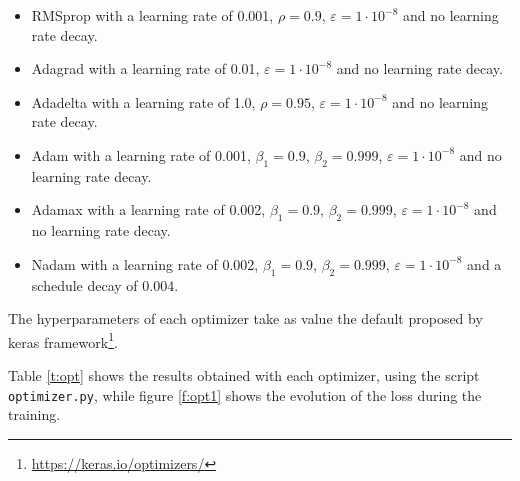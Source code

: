 \documentclass[]{article}
\begin{document}
\begin{itemize}
	\item RMSprop \cite{tieleman2012lecture} with a learning rate of 0.001, $ \rho = 0.9 $, $ \varepsilon = 1 \cdot 10^{-8} $ and no learning rate decay.
	\item Adagrad \cite{duchi2011adaptive} with a learning rate of 0.01, $ \varepsilon = 1 \cdot 10^{-8} $ and no learning rate decay.
	\item Adadelta \cite{zeiler2012adadelta} with a learning rate of 1.0, $ \rho = 0.95 $, $ \varepsilon = 1 \cdot 10^{-8} $ and no learning rate decay.
	\item Adam \cite{kingma2014adam} with a learning rate of 0.001, $ \beta_1 = 0.9 $, $ \beta_2 = 0.999 $, $ \varepsilon = 1 \cdot 10^{-8} $ and no learning rate decay.
	\item Adamax \cite{kingma2014adam} with a learning rate of 0.002, $ \beta_1 = 0.9 $, $ \beta_2 = 0.999 $, $ \varepsilon = 1 \cdot 10^{-8} $ and no learning rate decay.
	\item Nadam \cite{dozat2016incorporating} with a learning rate of 0.002, $ \beta_1 = 0.9 $, $ \beta_2 = 0.999 $, $ \varepsilon = 1 \cdot 10^{-8} $ and a schedule decay of 0.004.
\end{itemize}

The hyperparameters of each optimizer take as value the default proposed by keras framework\footnote{\url{https://keras.io/optimizers/}}.

Table \ref{t:opt} shows the results obtained with each optimizer, using the script \texttt{optimizer.py}, while figure \ref{f:opt1} shows the evolution of the loss during the training.
\end{document}
